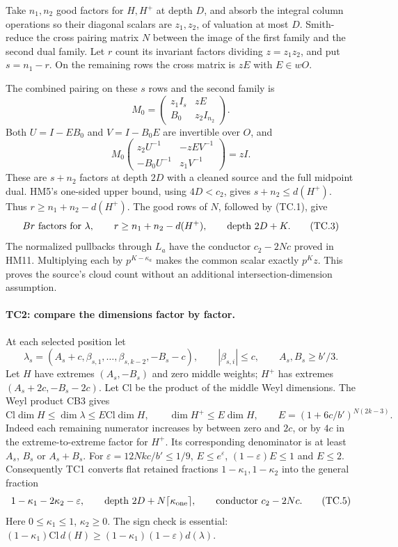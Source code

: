 \documentclass[11pt,a4paper]{article}
\numberwithin{equation}{section}
\theoremstyle{remark}\newtheorem{remark}[theorem]{Remark}
\begin{document}
Take $n_1,n_2$ good factors for $H,H^+$ at depth $D$, and
absorb the integral column operations so their diagonal scalars
are $z_1,z_2$, of valuation at most $D$. Smith-reduce the cross
pairing matrix $N$ between the image of the first family and
the second dual family. Let $r$ count its invariant factors
dividing $z=z_1z_2$, and put $s=n_1-r$. On the remaining rows
the cross matrix is $zE$ with $E\in wO$.

The combined pairing on these $s$ rows and the second family is
\[
 M_0=\begin{pmatrix}z_1I_s&zE\\ B_0&z_2I_{n_2}\end{pmatrix}.
\]
Both $U=I-EB_0$ and $V=I-B_0E$ are invertible over $O$, and
\[
 M_0
 \begin{pmatrix}
 z_2U^{-1}&-zEV^{-1}\\ -B_0U^{-1}&z_1V^{-1}
 \end{pmatrix}
       =zI.                                             \tag{TC.2}
\]
These are $s+n_2$ factors at depth $2D$ with a cleaned source
and the full midpoint dual. HM5's one-sided upper bound, using
$4D<c_2$, gives $s+n_2\le d(H^+)$. Thus
$r\ge n_1+n_2-d(H^+)$.
The good rows of $N$, followed by (TC.1), give
\[
 Br\ \hbox{factors for }\lambda,\qquad
 r\ge n_1+n_2-d(H^+),\qquad
 \hbox{depth }2D+K.                                    \tag{TC.3}
\]
The normalized pullbacks through $L_a$ have the conductor
$c_2-2Nc$ proved in HM11. Multiplying each by
$p^{K-\kappa_a}$ makes the common scalar exactly $p^Kz$.
This proves the source's cloud count without an additional
intersection-dimension assumption.

\paragraph{TC2: compare the dimensions factor by factor.}
At each selected position let
\[
 \lambda_s=(A_s+c,\beta_{s,1},\ldots,\beta_{s,k-2},-B_s-c),
 \qquad |\beta_{s,i}|\le c,\qquad A_s,B_s\ge b'/3.
\]
Let $H$ have extremes $(A_s,-B_s)$ and zero middle weights;
$H^+$ has extremes $(A_s+2c,-B_s-2c)$. Let $\mathrm{Cl}$ be
the product of the middle Weyl dimensions. The Weyl product CB3
gives
\[
 \mathrm{Cl}\dim H\le\dim\lambda\le E\mathrm{Cl}\dim H,
 \qquad \dim H^+\le E\dim H,\qquad
 E=(1+6c/b')^{N(2k-3)}.                                \tag{TC.4}
\]
Indeed each remaining numerator increases by between zero and
$2c$, or by $4c$ in the extreme-to-extreme factor for $H^+$.
Its corresponding denominator is at least $A_s$, $B_s$ or
$A_s+B_s$.
For $\varepsilon=12Nkc/b'\le1/9$,
$E\le e^\varepsilon$, $(1-\varepsilon)E\le1$ and $E\le2$.
Consequently TC1 converts flat retained fractions
$1-\kappa_1,1-\kappa_2$ into the general fraction
\[
 1-\kappa_1-2\kappa_2-\varepsilon,\qquad
 \hbox{depth }2D+N\lceil\kappa_{\rm one}\rceil,\qquad
 \hbox{conductor }c_2-2Nc.                             \tag{TC.5}
\]
Here $0\le\kappa_1\le1$, $\kappa_2\ge0$.
The sign check is essential:
$(1-\kappa_1)\mathrm{Cl}\,d(H)
\ge(1-\kappa_1)(1-\varepsilon)d(\lambda)$.
\end{document}
